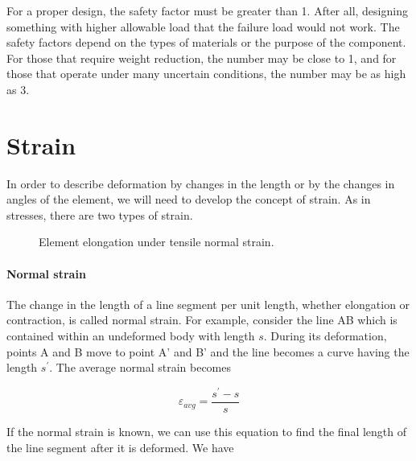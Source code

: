 \documentclass[
fontsize=10pt,
a4paper,
twosides=false,
open=any,
svgnames,
]{kaobook} %
\begin{document}
For a proper design, the safety factor must be greater than 1. After all, designing something with higher allowable load that the failure load would not work. The safety factors depend on the types of materials or the purpose of the component. For those that require weight reduction, the number may be close to 1, and for those that operate under many uncertain conditions, the number may be as high as 3.

\section{Strain}

In order to describe deformation by changes in the length or by the changes in angles of the element, we will need to develop the concept of strain. As in stresses, there are two types of strain.

\begin{figure}[h]
  \centering
  \caption{Element elongation under tensile normal strain.}
\end{figure}

\paragraph{Normal strain} The change in the length of a line segment per unit length, whether elongation or contraction, is called normal strain. For example, consider the line AB which is contained within an undeformed body with length $s$. During its deformation, points A and B move to point A’ and B’ and the line becomes a curve having the length $s^\prime$. The average normal strain becomes

\begin{equation}
  \varepsilon_{avg} = \frac{s^\prime - s}{s}
\end{equation}

If the normal strain is known, we can use this equation to find the final length of the line segment after it is deformed. We have
\end{document}
